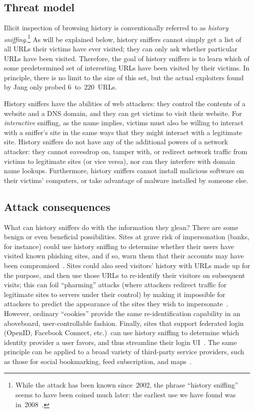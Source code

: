 \documentclass[conference]{IEEEtran}
\begin{document}
\subsection{Threat model} \label{sec:threatmodel}

Illicit inspection of browsing history is conventionally referred to
as \emph{history sniffing}.\footnote{While the attack has been known
  since~2002, the phrase “history sniffing” seems to have been coined
  much later: the earliest use we have found was
  in~2008~\cite{sniff_coinage}.}  As will be explained below, history
sniffers cannot simply get a list of all URLs their victims have ever
visited; they can only ask whether particular URLs have been visited.
Therefore, the goal of history sniffers is to learn which of some
predetermined set of interesting URLs have been visited by their
victims.  In principle, there is no limit to the size of this set, but
the actual exploiters found by Jang only probed 6~to~220~URLs.

History sniffers have the abilities of web attackers: they control
the contents of a website and a DNS domain, and they can get victims
to visit their website.  For \emph{interactive} sniffing, as the name
implies, victims must also be willing to interact with a sniffer's
site in the same ways that they might interact with a legitimate site.
History sniffers do not have any of the additional powers of a network
attacker: they cannot eavesdrop on, tamper with, or redirect network
traffic from victims to legitimate sites (or vice versa), nor can they
interfere with domain name lookups.  Furthermore, history sniffers
cannot install malicious software on their victims' computers, or take
advantage of malware installed by someone else.

\subsection{Attack consequences}\label{sec:consequences}

What can history sniffers do with the information they glean?  There
are some benign or even beneficial possibilities.  Sites at grave risk
of impersonation (banks, for instance) could use history sniffing to
determine whether their users have visited known phishing sites, and
if so, warn them that their accounts may have been
compromised~\cite{jackson06thirdpartycookies, browserrecon}.  Sites
could also seed visitors' history with URLs made up for the purpose,
and then use those URLs to re-identify their visitors on subsequent
visits; this can foil “pharming” attacks (where attackers redirect
traffic for legitimate sites to servers under their control) by making
it impossible for attackers to predict the appearance of the sites
they wish to impersonate~\cite{cachecookies}.  However, ordinary
“cookies” provide the same re-identification capability in an aboveboard,
user-controllable fashion.  Finally, sites that support federated
login (OpenID, Facebook Connect, etc.)\ can use history sniffing to
determine which identity provider a user favors, and thus streamline
their login UI~\cite{sl09openid}.  The same principle can be applied
to a broad variety of third-party service providers, such as those for
social bookmarking, feed subscription, and maps~\cite{sniff_coinage}.
\end{document}
